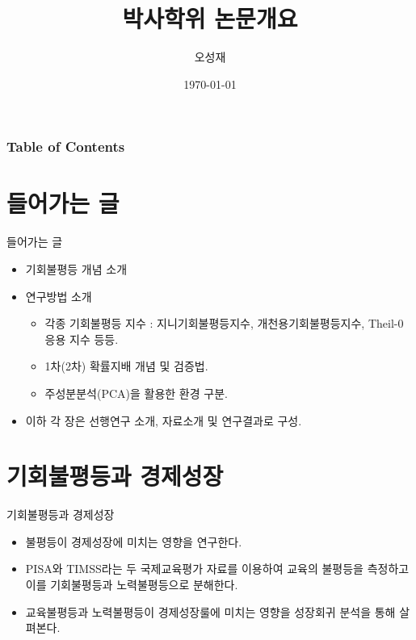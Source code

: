 \documentclass[handout, 10pt]{beamer}
\author{오성재}
\title{박사학위 논문개요}
\institute{서울대학교 경제학과 박사과정 \\ 박사학위 논문심사}
\date{\today}
\begin{document}
\begin{frame}
    \titlepage
\end{frame}


\begin{frame}
    \frametitle{Table of Contents}
    \tableofcontents[sectionstyle=show,subsectionstyle=show/shaded/hide,subsubsectionstyle=show/shaded/hide]
\end{frame}

\section{들어가는 글}
\begin{frame}{들어가는 글}
    \begin{itemize}
        \item 기회불평등 개념 소개
        \item 연구방법 소개
        \begin{itemize}
            \item 각종 기회불평등 지수 : 지니기회불평등지수, 개천용기회불평등지수, Theil-0응용 지수 등등.
            \item 1차(2차) 확률지배 개념 및 검증법.
            \item 주성분분석(PCA)을 활용한 환경 구분.
        \end{itemize}
        \item 이하 각 장은 선행연구 소개, 자료소개 및 연구결과로 구성.
    \end{itemize}
\end{frame}

\section{기회불평등과 경제성장}
\begin{frame}{기회불평등과 경제성장}
    \begin{itemize}
        \item 불평등이 경제성장에 미치는 영향을 연구한다.
        \item PISA와 TIMSS라는 두 국제교육평가 자료를 이용하여 교육의 불평등을 측정하고 이를 기회불평등과 노력불평등으로 분해한다.
        \item 교육불평등과 노력불평등이 경제성장룰에 미치는 영향을 성장회귀 분석을 통해 살펴본다.
    \end{itemize}
\end{frame}
\end{document}
